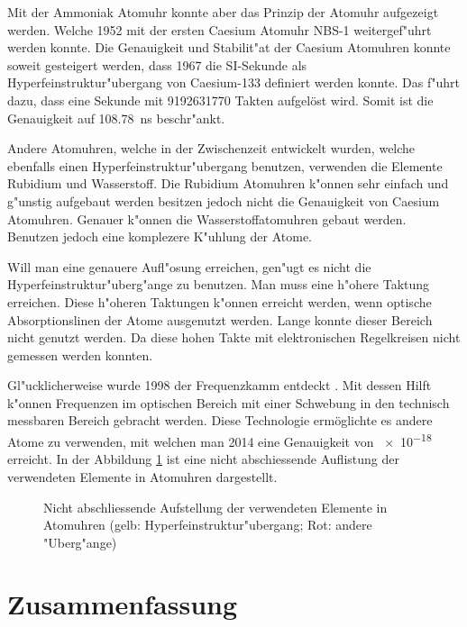 \begin{refsection}
Mit der Ammoniak Atomuhr konnte aber das Prinzip der Atomuhr
aufgezeigt werden.  Welche 1952 mit der ersten Caesium Atomuhr NBS-1
weitergef"uhrt werden konnte.  Die Genauigkeit und Stabilit"at der
Caesium Atomuhren konnte soweit gesteigert werden, dass 1967 die
SI-Sekunde als Hyperfeinstruktur"ubergang von Caesium-133 definiert
werden konnte.  Das f"uhrt dazu, dass eine Sekunde mit
\num{9192631770} Takten aufgelöst wird.  Somit ist die Genauigkeit auf
\SI{108.78}{\nano\second} beschr"ankt.

Andere Atomuhren, welche in der Zwischenzeit entwickelt wurden,
welche ebenfalls einen Hyperfeinstruktur"ubergang benutzen, verwenden
die Elemente Rubidium und Wasserstoff.  Die Rubidium Atomuhren k"onnen
sehr einfach und g"unstig aufgebaut werden besitzen jedoch nicht die
Genauigkeit von Caesium Atomuhren.  Genauer k"onnen die
Wasserstoffatomuhren gebaut werden.  Benutzen jedoch eine komplezere
K"uhlung der Atome.

Will man eine genauere Aufl"osung erreichen, gen"ugt es nicht die
Hyperfeinstruktur"uberg"ange zu benutzen.  Man muss eine h"ohere
Taktung erreichen.  Diese h"oheren Taktungen k"onnen erreicht werden,
wenn optische Absorptionslinen der Atome ausgenutzt werden.  Lange
konnte dieser Bereich nicht genutzt werden.  Da diese hohen Takte
mit elektronischen Regelkreisen nicht gemessen werden konnten.

Gl"ucklicherweise wurde 1998 der Frequenzkamm entdeckt
\cite{SdW:kamm}.  Mit dessen Hilft k"onnen Frequenzen im optischen
Bereich mit einer Schwebung in den technisch messbaren Bereich
gebracht werden.  Diese Technologie ermöglichte es andere Atome zu
verwenden, mit welchen man 2014 eine Genauigkeit von \num{e-18}
erreicht.  In der Abbildung \ref{fig:periode} ist eine nicht
abschiessende Auflistung der verwendeten Elemente in Atomuhren
dargestellt.

\begin{figure}
  \centering
  
  \caption{Nicht abschliessende Aufstellung der verwendeten Elemente
    in Atomuhren (gelb: Hyperfeinstruktur"ubergang; Rot: andere
    "Uberg"ange)}
  \label{fig:periode}
\end{figure}

\section{Zusammenfassung}

\printbibliography[heading=subbibliography]
\end{refsection}

